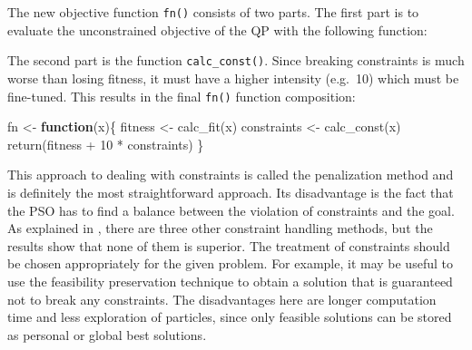 \documentclass[
  oneside]{book}
\newenvironment{Shaded}{\begin{snugshade}}{\end{snugshade}}
\newcommand{\ControlFlowTok}[1]{\textcolor[rgb]{0.13,0.29,0.53}{\textbf{#1}}}
\newcommand{\DecValTok}[1]{\textcolor[rgb]{0.00,0.00,0.81}{#1}}
\newcommand{\FloatTok}[1]{\textcolor[rgb]{0.00,0.00,0.81}{#1}}
\newcommand{\FunctionTok}[1]{\textcolor[rgb]{0.00,0.00,0.00}{#1}}
\newcommand{\NormalTok}[1]{#1}
\newcommand{\OtherTok}[1]{\textcolor[rgb]{0.56,0.35,0.01}{#1}}
\newcommand{\SpecialCharTok}[1]{\textcolor[rgb]{0.00,0.00,0.00}{#1}}
\begin{document}
The new objective function \texttt{fn()} consists of two parts. The first part is to evaluate the unconstrained objective of the QP with the following function:

\begin{Shaded}
\end{Shaded}

The second part is the function \texttt{calc\_const()}. Since breaking constraints is much worse than losing fitness, it must have a higher intensity (e.g.~10) which must be fine-tuned. This results in the final \texttt{fn()} function composition:

\begin{Shaded}
\begin{Highlighting}[]
\NormalTok{fn }\OtherTok{\textless{}{-}} \ControlFlowTok{function}\NormalTok{(x)\{}
\NormalTok{  fitness }\OtherTok{\textless{}{-}} \FunctionTok{calc\_fit}\NormalTok{(x)}
\NormalTok{  constraints }\OtherTok{\textless{}{-}} \FunctionTok{calc\_const}\NormalTok{(x)}
  \FunctionTok{return}\NormalTok{(fitness }\SpecialCharTok{+} \DecValTok{10} \SpecialCharTok{*}\NormalTok{ constraints)}
\NormalTok{\}}
\end{Highlighting}
\end{Shaded}

This approach to dealing with constraints is called the penalization method and is definitely the most straightforward approach. Its disadvantage is the fact that the PSO has to find a balance between the violation of constraints and the goal. As explained in \citep{InSi2008}, there are three other constraint handling methods, but the results show that none of them is superior. The treatment of constraints should be chosen appropriately for the given problem. For example, it may be useful to use the feasibility preservation technique to obtain a solution that is guaranteed not to break any constraints. The disadvantages here are longer computation time and less exploration of particles, since only feasible solutions can be stored as personal or global best solutions.
\end{document}
